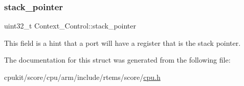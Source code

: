 \subsubsection{\texorpdfstring{stack\_pointer}{stack\_pointer}}
{\footnotesize\ttfamily uint32\+\_\+t Context\+\_\+\+Control\+::stack\+\_\+pointer}

This field is a hint that a port will have a register that is the stack pointer. 

The documentation for this struct was generated from the following file\+:\begin{DoxyCompactItemize}
\item 
cpukit/score/cpu/arm/include/rtems/score/\mbox{\hyperlink{arm_2include_2rtems_2score_2cpu_8h}{cpu.\+h}}\end{DoxyCompactItemize}
